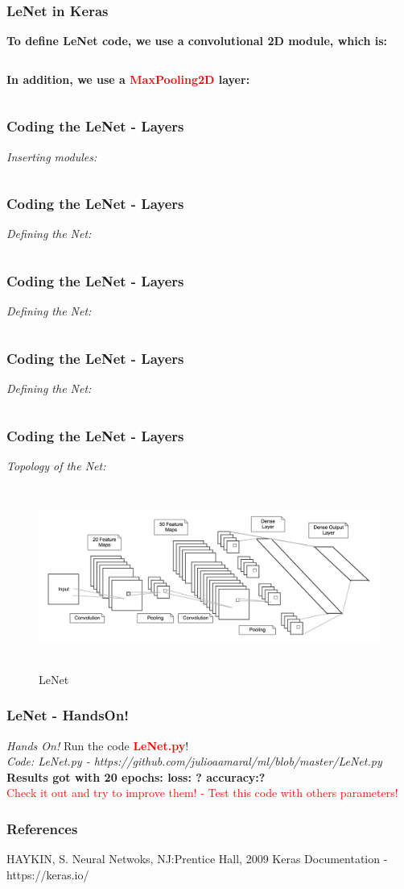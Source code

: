 \documentclass[aspectratio=169]{beamer}
\begin{document}
\begin{frame}
\frametitle{LeNet in Keras}
\textbf{To define LeNet code, we use a convolutional 2D module, which is:}
\inputminted{python}{./aux_files/twentyeight.py}
\textbf{In addition, we use a \textcolor{red}{MaxPooling2D} layer:}
\inputminted{python}{./aux_files/twentynine.py}
\end{frame}

\begin{frame}
\frametitle{Coding the LeNet - Layers}
\emph{Inserting  modules:}
\inputminted{python}{./aux_files/thirty.py}
\end{frame}

\begin{frame}
\frametitle{Coding the LeNet - Layers}
\emph{Defining the Net:}
\inputminted{python}{./aux_files/thirtyone.py}
\end{frame}

\begin{frame}
\frametitle{Coding the LeNet - Layers}
\emph{Defining the Net:}
\inputminted{python}{./aux_files/thirtytwo.py}
\end{frame}

\begin{frame}
\frametitle{Coding the LeNet - Layers}
\emph{Defining the Net:}
\inputminted{python}{./aux_files/thirtythree.py}
\end{frame}

\begin{frame}
\frametitle{Coding the LeNet - Layers}
\emph{Topology of the Net:}
\begin{figure}
\includegraphics[width=12cm,height=6cm]{./aux_files/four.jpg}
\caption{LeNet}
\label{fig:LeNet Topology}
\end{figure}
\end{frame}

\begin{frame}
\frametitle{LeNet - HandsOn!}
\emph{Hands On!}
Run the code \textcolor{red}{\textbf{LeNet.py}}! 
\\[0.5cm]
\emph{Code: LeNet.py - https://github.com/julioaamaral/ml/blob/master/LeNet.py}
\\[0.3cm]
\textbf{Results got with 20 epochs: loss: ? accuracy:?}
\\[0.3cm]
\textcolor{red}{Check it out and try to improve them! - Test this code with others parameters!}
\end{frame}

\begin{frame}
\frametitle{References}
\footnotesize{
\begin{thebibliography}{99} 
 HAYKIN, S. Neural Netwoks, NJ:Prentice Hall, 2009
 Keras Documentation - https://keras.io/
\end{thebibliography}
}
\end{frame}
\end{document}
